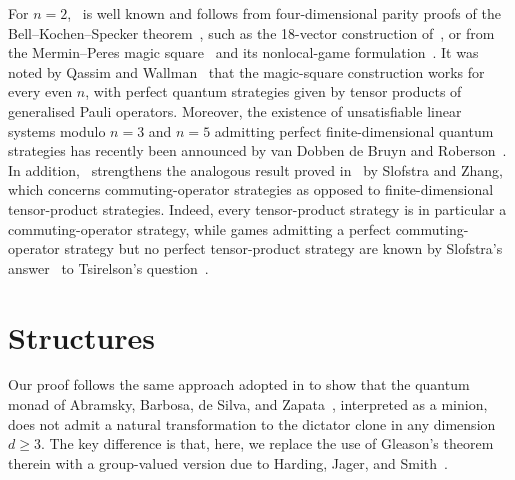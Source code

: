 \documentclass[11pt]{article}
\theoremstyle{plain}
\theoremstyle{definition}
\theoremstyle{remark}
\begin{document}
For $n=2$,~ is well known and follows from four-dimensional parity proofs of the Bell--Kochen--Specker theorem~\cite{bell1966problem,kochen1967problem}, such as the 18-vector construction of~\cite{cabello1996bell}, or from the Mermin--Peres magic square~\cite{mermin1990simple,peres1990incompatible} and its nonlocal-game formulation~\cite{cabello2001all,aravind2004quantum}.
%
It was noted  by Qassim and Wallman~\cite{qassim2020classical} that the magic-square construction works for every even $n$, with perfect quantum strategies given by tensor products of generalised Pauli operators.
%
Moreover, the existence of unsatisfiable linear systems modulo $n=3$ and $n=5$ admitting perfect finite-dimensional quantum strategies has recently been announced by van Dobben de Bruyn and Roberson~\cite{vDobben2026magic}.
%
In addition,~ strengthens the analogous result proved in~\cite{slofstra2024operator} by Slofstra and Zhang, which concerns commuting-operator strategies as opposed to finite-dimensional tensor-product strategies.
Indeed, every tensor-product strategy is in particular a commuting-operator strategy,
while games admitting a perfect commuting-operator strategy but no perfect tensor-product  strategy are known by Slofstra's answer~\cite{slofstra2020tsirelson} to Tsirelson's question~\cite{tsirelson2006bell}.














\section{Structures}
\label{sec_structures}
Our proof follows the same approach adopted in
\cite[Proposition~15]{ciardo_quantum_minion} to  show that the quantum monad of Abramsky, Barbosa, de Silva, and Zapata~\cite{abramsky2017quantum}, interpreted as a minion, does not admit a natural transformation to the dictator clone in any dimension $d\geq 3$. The key difference is that, here, we replace the use of Gleason's theorem~\cite{gleason1975measures} therein with a group-valued version due to Harding, Jager, and
Smith~\cite{harding2005group}.
\end{document}
